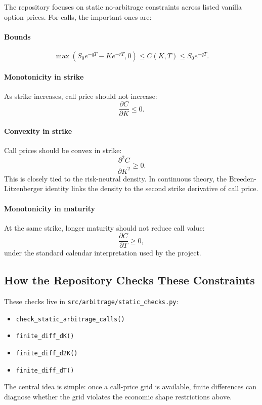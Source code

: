 \documentclass[11pt]{article}
\begin{document}
The repository focuses on static no-arbitrage constraints across listed vanilla option prices. For calls, the important ones are:

\paragraph{Bounds}
\[
\max(S_0 e^{-qT}-Ke^{-rT},0)\le C(K,T)\le S_0 e^{-qT}.
\]

\paragraph{Monotonicity in strike}
As strike increases, call price should not increase:
\[
\frac{\partial C}{\partial K}\le 0.
\]

\paragraph{Convexity in strike}
Call prices should be convex in strike:
\[
\frac{\partial^2 C}{\partial K^2}\ge 0.
\]
This is closely tied to the risk-neutral density. In continuous theory, the Breeden-Litzenberger identity links the density to the second strike derivative of call price.

\paragraph{Monotonicity in maturity}
At the same strike, longer maturity should not reduce call value:
\[
\frac{\partial C}{\partial T}\ge 0,
\]
under the standard calendar interpretation used by the project.

\subsection{How the Repository Checks These Constraints}

These checks live in \texttt{src/arbitrage/static\_checks.py}:

\begin{itemize}
  \item \texttt{check\_static\_arbitrage\_calls()}
  \item \texttt{finite\_diff\_dK()}
  \item \texttt{finite\_diff\_d2K()}
  \item \texttt{finite\_diff\_dT()}
\end{itemize}

The central idea is simple: once a call-price grid is available, finite differences can diagnose whether the grid violates the economic shape restrictions above.
\end{document}
